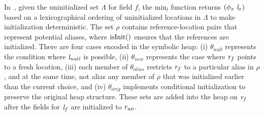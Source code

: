 In~, given the uninitialized set $\Lambda$ for
field $f$, the $\mathrm{min}_l$ function returns
$(\phi_x\ \cfgnt{l}_x)$ based on a lexicographical ordering of
uninitialized locations in $\Lambda$ to make initialization
deterministic.  The set $\rho$ contains reference-location pairs that
represent potential aliases, where $\mathrm{isInit}()$ ensures that the references are initialized. 
There are four cases encoded in the
symbolic heap: (i) $\theta_\mathit{null}$ represents the condition
where $\emph{l}_\mathit{null}$ is possible, (ii)
$\theta_\mathit{new}$ represents the case where $\emph{r}_f$ points
to a fresh location, (iii) each member of $\theta_\mathit{alias}$
restricts $\emph{r}_f$ to a particular alias in $\rho$, and at the
same time, not alias any member of $\rho$ that was initialized earlier
than the current choice, and (iv) $\theta_\mathit{orig}$ implements
conditional initialization to preserve the original heap structure.
These sets are added into the heap on $\emph{r}_f$ after the fields
for $\emph{l}_f$ are initialized to $\emph{r}_\mathit{un}$.

